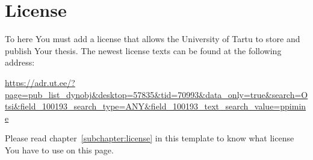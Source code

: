\section*{License} \label{license} 
To here You must add a license that allows the University of Tartu to store and publish Your thesis. The newest license texts can be found at the following address:

\url{https://adr.ut.ee/?page=pub_list_dynobj&desktop=57835&tid=70993&data_only=true&search=Otsi&field_100193_search_type=ANY&field_100193_text_search_value=ppimine}

Please read chapter~\ref{subchapter:license} in this template to know what license You have to use on this page.
